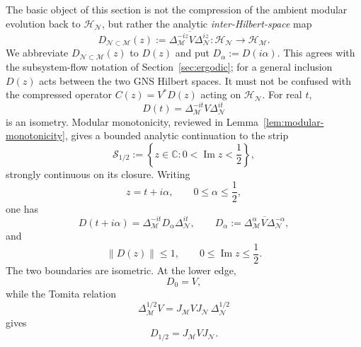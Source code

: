 \documentclass[a4paper,11pt]{article}
\theoremstyle{definition}
\newcommand{\mN}{\mathcal{N}}
\newcommand{\mH}{\mathcal{H}}
\newcommand{\mM}{\mathcal{M}}
\begin{document}
The basic object of this section is not the compression of the ambient
modular evolution back to $\mH_{\mN}$, but rather the analytic
\emph{inter-Hilbert-space} map
\begin{equation}
    D_{\mN\subset\mM}(z)
    :=
    \overline{
    \Delta_{\mM}^{-iz}V\Delta_{\mN}^{iz}}
    :
    \mH_{\mN}\longrightarrow\mH_{\mM} .
    \label{eq:Wz-definition}
\end{equation}
We abbreviate $D_{\mN\subset\mM}(z)$ to $D(z)$ and put
$D_\alpha:=D(i\alpha)$. This agrees with the subsystem-flow
notation of Section~\ref{sec:ergodic}; for a general inclusion $D(z)$
acts between the two GNS Hilbert spaces. It must not be confused with
the compressed operator $C(z)=V^*D(z)$ acting on $\mH_{\mN}$.
For real $t$,
\begin{equation}
    D(t)=\Delta_{\mM}^{-it}V\Delta_{\mN}^{it}
\end{equation}
is an isometry. Modular monotonicity, reviewed in
Lemma~\ref{lem:modular-monotonicity}, gives a bounded analytic continuation
to the strip
\begin{equation}
    \mathcal S_{1/2}
    :=
    \left\{
    z\in\mathbb C:
    0<\operatorname{Im}z<\frac12
    \right\},
\end{equation}
strongly continuous on its closure. Writing
\begin{equation}
    z=t+i\alpha,
    \qquad
    0\leq\alpha\leq\frac12 ,
\end{equation}
one has
\begin{equation}
    D(t+i\alpha)
    =
    \Delta_{\mM}^{-it}
    D_\alpha
    \Delta_{\mN}^{it},
    \qquad
    D_\alpha
    :=
    \overline{
    \Delta_{\mM}^\alpha V\Delta_{\mN}^{-\alpha}},
    \label{eq:W-alpha-strip}
\end{equation}
and
\begin{equation}
    \boxed{
    \|D(z)\|\leq1,
    \qquad
    0\leq\operatorname{Im}z\leq\frac12 .
    }
    \label{eq:W-strip-bound}
\end{equation}
The two boundaries are isometric. At the lower edge,
\begin{equation}
    D_0=V,
\end{equation}
while the Tomita relation
\begin{equation}
    \Delta_{\mM}^{1/2}V
    =
    J_{\mM}VJ_{\mN}\,\Delta_{\mN}^{1/2}
\end{equation}
gives
\begin{equation}
    \boxed{
    D_{1/2}=J_{\mM}VJ_{\mN} .
    }
    \label{eq:W-half}
\end{equation}
\end{document}

